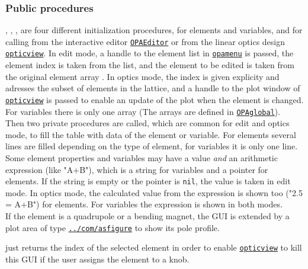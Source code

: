 \documentclass[12pt]{article}
\newcommand\code[1]{{\tt #1}}
\newcommand\guico[1]{{\color{blue}\code{#1}}}
\newcommand{\unico}[1]{{\color{burntorange}\code{#1}}}
\newcommand{\opagui}[1]{\colorbox{blue!20}{\code{#1}}}
\newcommand{\ogui}[1]{\hyperref[#1]{\opagui{#1}}}
\newcommand{\opaguif}[1]{\colorbox{violet!30}{\code{#1}}}
\newcommand{\oguif}[1]{\hyperref[#1]{\opaguif{#1}}}
\newcommand{\opauni}[1]{\colorbox{orange!30}{\code{#1}}}
\newcommand{\ouni}[1]{\hyperref[#1]{\opauni{#1}}}
\newcommand{\ppro}[1]{\subsubsection*{Public procedures} #1}
\begin{document}
\ppro{
\guico{InitE}, \guico{InitEVar}, \guico{InitO},  \guico{InitOVar} are four different initialization procedures, for elements and variables, and for calling from the interactive editor \ogui{OPAEditor} or from the linear optics design \ogui{opticview}. In edit mode, a handle to the element list in \ogui{opamenu} is passed, the element index is taken from the list, and the element to be edited is taken from the original element array \unico{Elem}. In optics mode, the index is given explicity and adresses the \unico{Ella} subset of elements in the lattice, and a handle to the plot window of \ogui{opticview} is passed to enable an update of the plot when the element is changed. For variables there is only one array \unico{Variable} (The arrays are defined in \ouni{OPAglobal}). \\
Then two private procedures are called, which are common for edit and optics mode, to fill the table with data of the element or variable. For elements several lines are filled depending on the type of element, for variables it is only one line. Some element properties and variables may have a value {\em and} an arithmetic expression (like "A+B"), which is a string for variables and a pointer for elements. If the string is empty or the pointer is \code{nil}, the value is taken in edit mode. In optics mode, the calculated value from the expression is shown too ("2.5 = A+B") for elements. For variables the expression is shown in both modes.\\
If the element is a quadrupole or a bending magnet, the GUI is extended by a plot area of type \oguif{../com/asfigure} to show its pole profile.

\guico{getJelem} just returns the index of the selected element in order to enable \ogui{opticview} to kill this GUI if the user assigns the element to a knob.
}
\end{document}
